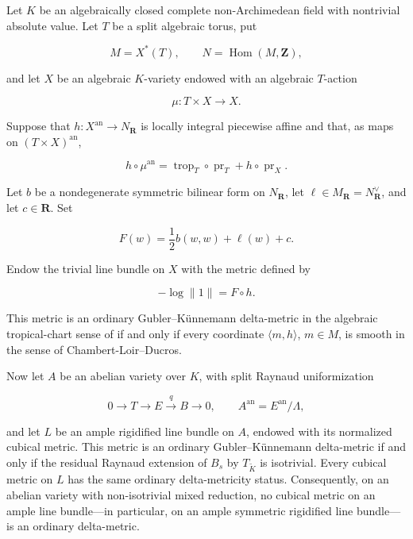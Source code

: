 
\begin{theorem}
\label{thm:p09p2-product-gauss-candidate}
Let \(K\) be an algebraically closed complete non-Archimedean field with
nontrivial absolute value.  Let \(T\) be a split algebraic torus, put

\[
 M=X^*(T),\qquad N=\operatorname{Hom}(M,\mathbf Z),
\]

and let \(X\) be an algebraic \(K\)-variety endowed with an algebraic
\(T\)-action

\[
                     \mu:T\times X\longrightarrow X.
\]

Suppose that \(h:X^{\mathrm{an}}\to N_{\mathbf R}\) is locally integral
piecewise affine and that, as maps on \((T\times X)^{\mathrm{an}}\),

\begin{equation}
\label{eq:p09p2-product-equivariance}
 h\circ\mu^{\mathrm{an}}
 =\operatorname{trop}_T\circ\operatorname{pr}_T
  +h\circ\operatorname{pr}_X.
\end{equation}

Let \(b\) be a nondegenerate symmetric bilinear form on
\(N_{\mathbf R}\), let \(\ell\in M_{\mathbf R}=N_{\mathbf R}^{\vee}\), and
let \(c\in\mathbf R\).  Set

\[
                  F(w)=\frac12 b(w,w)+\ell(w)+c.
\]

Endow the trivial line bundle on \(X\) with the metric defined by

\[
                         -\log\lVert1\rVert=F\circ h.
\]

This metric is an ordinary Gubler--K\"unnemann delta-metric in the
algebraic tropical-chart sense of \cite[Definition~9.9]{GK17} if and only
if every coordinate \(\langle m,h\rangle\), \(m\in M\), is smooth in the
sense of Chambert-Loir--Ducros.

Now let \(A\) be an abelian variety over \(K\), with split Raynaud
uniformization

\[
  0\longrightarrow T\longrightarrow E\xrightarrow{q}B\longrightarrow0,
  \qquad
  A^{\mathrm{an}}=E^{\mathrm{an}}/\Lambda,
\]

and let \(L\) be an ample rigidified line bundle on \(A\), endowed with its
normalized cubical metric.  This metric is an ordinary
Gubler--K\"unnemann delta-metric if and only if the residual Raynaud
extension of \(B_s\) by \(T_{\widetilde K}\) is isotrivial.  Every cubical
metric on \(L\) has the same ordinary delta-metricity status.  Consequently,
on an abelian variety with non-isotrivial mixed reduction, no cubical metric
on an ample line bundle---in particular, on an ample symmetric rigidified
line bundle---is an ordinary delta-metric.
\end{theorem}
